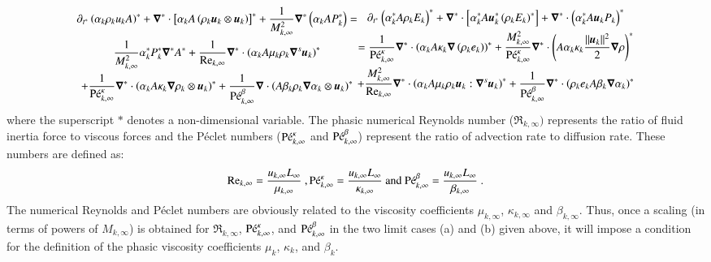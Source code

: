 \documentclass[preprint,10pt]{elsarticle}
\begin{document}
\begin{enumerate}
\begin{subequations}
\begin{multline}
\end{multline}
%
\begin{multline}\label{eq:sev_equ-with-diss-terms-mom_case_one_scaled}
\partial_{t^*} \left( \alpha_k \rho_k u_k A \right)^* + \grad^* \cdot \left[ \alpha_k A \left( \rho_k \mbold u_k \otimes \mbold u_k\right)\right]^* + \frac{1}{M^2_{k,\infty}}\grad^* \left( \alpha_k A P_k^* \right) = \\
  \frac{1}{M^2_{k,\infty}} \alpha_k^* P^*_k \grad^* A^*  
+ \frac{1}{\Re_{k,\infty}}\grad^* \cdot \left( \alpha_k A \mu_k \rho_k \grad^s \mbold u_k \right)^* \\ 
+ \frac{1}{\Pe_{k,\infty}^\kappa} \grad^* \cdot\left( \alpha_k A \kappa_k \grad \rho_k \otimes \mbold u_k \right)^* 
+ \frac{1}{\Pe_{k,\infty}^\beta} \grad \cdot \left( A \beta_k \rho_k \grad \alpha_k \otimes \mbold u_k \right)^*
\end{multline}
%
\begin{multline}\label{eq:sev_equ-with-diss-terms-ener_case_one_scaled}
\partial_{t^*} \left( \alpha_k^* A \rho_k E_k \right)^* + \grad^* \cdot \left[ \alpha_k^* A \mbold u_k^*  \left( \rho_k E_k \right)^* \right] +  \grad^* \cdot \left(\alpha_k^* A \mbold u_k P_k \right)^*  \\ =
\frac{1}{\Pe_{k,\infty}^\kappa} \grad^* \cdot \left( \alpha_k A \kappa_k \grad \left( \rho_k e_k \right) \right)^* 
+ \frac{M^2_{k,\infty}}{\Pe_{k,\infty}^\kappa} \grad^* \cdot \left( A\alpha_k \kappa_k \frac{||\mbold u_k||^2}{2} \grad \rho \right)^*  \\
+ \frac{M^2_{k,\infty}}{\Re_{k,\infty}} \grad^* \cdot \left( \alpha_k A \mu_k \rho_k \mbold u_k : \grad^s \mbold u_k\right)^* 
+ \frac{1}{\Pe_{k,\infty}^\beta } \grad^*\cdot \left( \rho_k e_k A \beta_k \grad \alpha_k \right)^*
\end{multline}
%
\end{subequations}
%
where the superscript $*$ denotes a non-dimensional variable. The phasic numerical Reynolds number ($\Re_{k,\infty})$ represents the ratio of fluid inertia force to viscous forces and 
the P\'eclet numbers ($\textrm{P\'e}_{k,\infty}^\kappa$ and $\textrm{P\'e}_{k,\infty}^\beta$) represent the ratio of advection rate to diffusion rate. These numbers are defined as:
%
\begin{equation}
\label{eq:ref_numb}
\textrm{Re}_{k,\infty} = \frac{u_{k,\infty} L_\infty}{\mu_{k,\infty}} \ ,
\textrm{P\'e}_{k,\infty}^\kappa = \frac{u_{k,\infty} L_\infty}{\kappa_{k,\infty}} \text{ and }
\textrm{P\'e}_{k,\infty}^\beta = \frac{u_{k,\infty} L_\infty}{\beta_{k,\infty}} \ .
\end{equation}
%
The numerical Reynolds and P\'eclet numbers are obviously related to the 
viscosity coefficients $\mu_{k,\infty}$, $\kappa_{k,\infty}$ and $\beta_{k,\infty}$. Thus, once a scaling (in terms of powers of $M_{k,\infty}$) 
is obtained for $\Re_{k,\infty}$, $\textrm{P\'e}_{k,\infty}^\kappa$, and $\textrm{P\'e}_{k,\infty}^\beta$ in the two limit cases (a) and (b) given above, it will 
impose a condition for the definition of the phasic viscosity coefficients $\mu_k$, $\kappa_k$, and $\beta_k$. 
\end{enumerate} 
\end{document}
